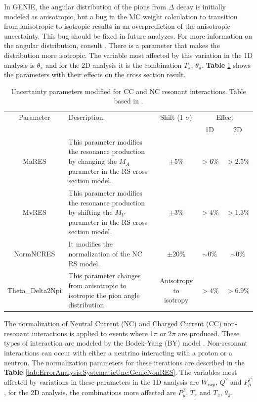 In GENIE, the angular distribution of the pions from $\Delta$ decay is initially modeled as anisotropic, but a bug in the MC weight calculation to transition from anisotropic to isotropic results in an overprediction of the anisotropic uncertainty. This bug should be fixed in future analyzes. For more information on the angular distribution, consult \cite{Genie}. There is a parameter that makes the distribution more isotropic. The variable most affected by this variation in the 1D analysis is $\theta_\pi$ and for the 2D analysis it is the combination $T_\pi$, $\theta_\pi$. \textbf{Table} \ref{tab:ErrorAnalysis:SystematicUnc:GenieRESmodels} shows the parameters with their effects on the cross section result.

\begin{table}[!htb]
    \centering
    \begin{tabular}{c|p{1.8in}|c|c|c}
        \hline 
        Parameter & Description.  & Shift (1 $\sigma$) & \multicolumn{2}{c}{Effect} \\
         & & & 1D & 2D \\
        \hline 
        MaRES & This parameter modifies the resonance production by changing the $M_A$ parameter in the RS cross section model. & $\pm5\%$ & $>6\%$ & $>2.5\%$ \\ \hline
        MvRES & This parameter modifies the resonance production by shifting the $M_V$ parameter in the RS cross section model. & $\pm3\%$ & $>4\%$ & $>1.3\%$\\ \hline
        NormNCRES & It modifies the normalization of the NC RS model. & $\pm20\%$ & $\sim 0\%$ & $\sim0\%$ \\ \hline
        Theta\_Delta2Npi & This parameter changes from anisotropic to isotropic the pion angle distribution & \makecell{Anisotropy to \\ isotropy} & $>4\%$ & $>6.9\%$ \\ \hline
    \end{tabular}
    \caption{Uncertainty parameters modified for CC and NC resonant interactions. Table based in \cite{GENIEUnc}.}
    \label{tab:ErrorAnalysis:SystematicUnc:GenieRESmodels}
\end{table}

The normalization of Neutral Current (NC) and Charged Current (CC) non-resonant interactions is applied to events where 1$\pi$ or 2$\pi$ are produced. These types of interaction are modeled by the Bodek-Yang (BY) model \cite{Yang_2009}. Non-resonant interactions can occur with either a neutrino interacting with a proton or a neutron. The normalization parameters for these iterations are described in the \textbf{Table} \ref{tab:ErrorAnalysis:SystematicUnc:GenieNonRES}. The variables most affected by variations in these parameters in the 1D analysis are $W_{exp}$, $Q^2$ and $P^T_\mu$, for the 2D analysis, the combinations more affected are $P^T_\mu$, $T_\pi$ and $T_\pi$, $\theta_\pi$.

